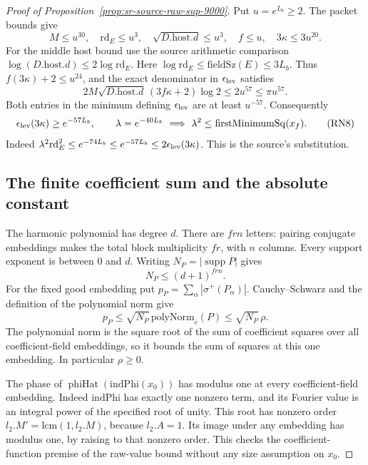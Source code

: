 \begin{proof}[Proof of Proposition~\ref{prop:sr-source-raw-sup-9000}]
Put \(u=e^{L_b}\ge2\).  The packet bounds give
\[
 M\le u^{30},\quad \mathrm{rd}_E\le u^3,\quad
 \sqrt{D.\mathrm{host}.d}\le u^3,\quad
 f\le u,\quad 3\kappa\le3u^{20}.
\]
For the middle host bound use the source arithmetic comparison
\(\log(D.\mathrm{host}.d)\le2\log\mathrm{rd}_E\).
Here \(\log\mathrm{rd}_E\le\mathrm{fieldSz}(E)\le3L_b\).
Thus \(f(3\kappa)+2\le u^{24}\), and the exact denominator in
\(\epsilon_{\rm lev}\) satisfies
\[
 2M\sqrt{D.\mathrm{host}.d}\,(3f\kappa+2)\log2
       \le2u^{57}\le\pi u^{57}.
\]
Both entries in the minimum defining \(\epsilon_{\rm lev}\)
are at least \(u^{-57}\).
Consequently
\[
 \epsilon_{\rm lev}(3\kappa)\ge e^{-57L_b},\qquad
 \lambda=e^{-40L_b}\ \Longrightarrow\
      \lambda^2\le\mathrm{firstMinimumSq}(x_f).
 \tag{RN8}\label{eq:sr-source-raw-lambda}
\]
Indeed \(\lambda^2\mathrm{rd}_E^2\le e^{-74L_b}
\le e^{-57L_b}\le2\epsilon_{\rm lev}(3\kappa)\).
This is the source's  substitution.

\subsection{The finite coefficient sum and the absolute constant}
The harmonic polynomial has degree \(d\).
There are \(frn\) letters: pairing conjugate embeddings makes
the total block multiplicity \(fr\), with \(n\) columns.
Every support exponent is between \(0\) and \(d\).
Writing \(N_P=|\operatorname{supp}P|\) gives
\[
 N_P\le(d+1)^{frn}.
\]
For the fixed good embedding put
\(p_P=\sum_\alpha|\sigma^+(P_\alpha)|\).
Cauchy--Schwarz and the definition of the polynomial norm give
\[
 p_P\le\sqrt{N_P}\,\mathrm{polyNorm}_c(P)
                                      \le\sqrt{N_P}\,\rho .
 \tag{RN9}\label{eq:sr-source-raw-polynomial-sum}
\]
The polynomial norm is the square root of the sum of coefficient
squares over all coefficient-field embeddings, so it bounds the
sum of squares at this one embedding.
In particular \(\rho\ge0\).

The phase of \(\operatorname{phiHat}(\mathrm{indPhi}(x_0))\) has modulus one
at every coefficient-field embedding.
Indeed \(\mathrm{indPhi}\) has exactly one nonzero term,
and its Fourier value is an integral power of the specified
root of unity.  This root has nonzero order
\(l_2.M'=\mathrm{lcm}(1,l_2.M)\), because \(l_2.A=1\).
Its image under any embedding has modulus one, by raising
to that nonzero order.
This checks the coefficient-function premise of the raw-value
bound without any size assumption on \(x_0\).


\end{proof}
